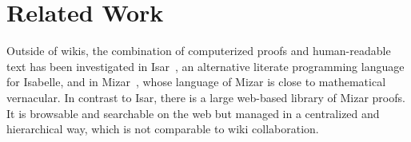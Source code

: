 \section{Related Work}
\label{sec:related}

\begin{background}
Outside of wikis, the combination of computerized proofs and human-readable text
has been investigated in Isar~\cite{Wenzel:isar99}, an alternative literate
programming language for Isabelle, and in Mizar~\cite{MizarKB}, whose language
of Mizar is close to mathematical vernacular.  In contrast to Isar, there is a
large web-based library of Mizar proofs. It is browsable and searchable on the
web but managed in a centralized and hierarchical way, which is not comparable
to wiki collaboration.





\end{background}
